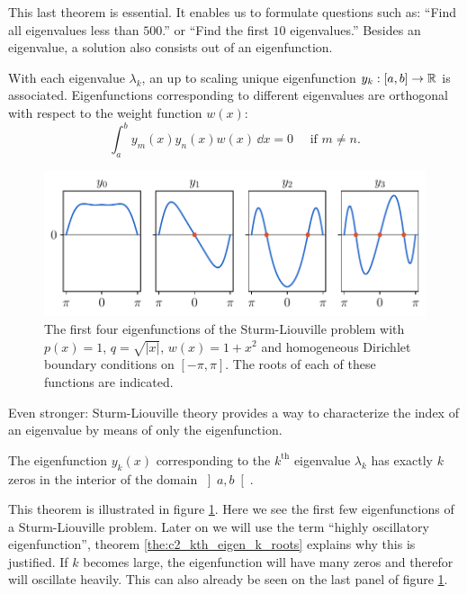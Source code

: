 This last theorem is essential. It enables us to formulate questions such as: ``Find all eigenvalues less than $500$.'' or ``Find the first $10$ eigenvalues.'' Besides an eigenvalue, a solution also consists out of an eigenfunction.

\begin{theorem}
    With each eigenvalue $\lambda_k$, an up to scaling unique eigenfunction $y_k : [a, b] \to \mathbb{R}$ is associated. Eigenfunctions corresponding to different eigenvalues are orthogonal with respect to the weight function $w(x)$:
    $$
        \int_a^b y_m(x) y_n(x) w(x) \, \dd x = 0 \quad \text{ if $m \neq n$.}
    $$
\end{theorem}

\begin{figure}
    \begin{center}
        \includegraphics[width=\textwidth]{img/chapter2/slp_count_roots.pdf}
    \end{center}
    \caption{The first four eigenfunctions of the Sturm-Liouville problem with $p(x) = 1$, $q = \sqrt{|x|}$, $w(x) = 1+x^2$ and homogeneous Dirichlet boundary conditions on $[-\pi, \pi]$. The roots of each of these functions are indicated.}
    \label{fig:c2_sturm_liovuille_k_roots}
\end{figure}

Even stronger: Sturm-Liouville theory provides a way to characterize the index of an eigenvalue by means of only the eigenfunction.

\begin{theorem}\label{the:c2_kth_eigen_k_roots}
    The eigenfunction $y_k(x)$ corresponding to the $k^{\text{th}}$ eigenvalue $\lambda_k$ has exactly $k$ zeros in the interior of the domain $\left]a, b\right[$.
\end{theorem}

This theorem is illustrated in figure \ref{fig:c2_sturm_liovuille_k_roots}. Here we see the first few eigenfunctions of a Sturm-Liouville problem. Later on we will use the term ``highly oscillatory eigenfunction'', theorem \ref{the:c2_kth_eigen_k_roots} explains why this is justified. If $k$ becomes large, the eigenfunction will have many zeros and therefor will oscillate heavily. This can also already be seen on the last panel of figure \ref{fig:c2_sturm_liovuille_k_roots}.

